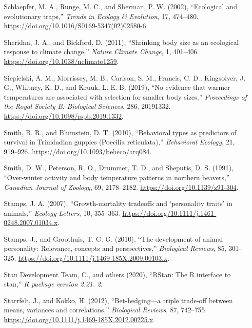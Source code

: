 \documentclass[
  12pt,
  letterpaper,
]{scrartcl}
\newlength{\cslhangindent}
\newenvironment{CSLReferences}[2] %
 {\begin{list}{}{%
  \setlength{\itemindent}{0pt}
  \setlength{\leftmargin}{0pt}
  \setlength{\parsep}{0pt}
  \ifodd #1
   \setlength{\leftmargin}{\cslhangindent}
   \setlength{\itemindent}{-1\cslhangindent}
  \fi
  \setlength{\itemsep}{#2\baselineskip}}}
 {\end{list}}
\begin{document}
\begin{CSLReferences}{1}{0}
Schlaepfer, M. A., Runge, M. C., and Sherman, P. W. (2002),
{``Ecological and evolutionary traps,''} \emph{Trends in Ecology \&
Evolution}, 17, 474--480.
\url{https://doi.org/10.1016/S0169-5347(02)02580-6}.

Sheridan, J. A., and Bickford, D. (2011), {``Shrinking body size as an
ecological response to climate change,''} \emph{Nature Climate Change},
1, 401--406. \url{https://doi.org/10.1038/nclimate1259}.

Siepielski, A. M., Morrissey, M. B., Carlson, S. M., Francis, C. D.,
Kingsolver, J. G., Whitney, K. D., and Kruuk, L. E. B. (2019), {``No
evidence that warmer temperatures are associated with selection for
smaller body sizes,''} \emph{Proceedings of the Royal Society B:
Biological Sciences}, 286, 20191332.
\url{https://doi.org/10.1098/rspb.2019.1332}.

Smith, B. R., and Blumstein, D. T. (2010), {``Behavioral types as
predictors of survival in {Trinidadian} guppies ({Poecilia}
reticulata),''} \emph{Behavioral Ecology}, 21, 919--926.
\url{https://doi.org/10.1093/beheco/arq084}.

Smith, D. W., Peterson, R. O., Drummer, T. D., and Sheputis, D. S.
(1991), {``Over-winter activity and body temperature patterns in
northern beavers,''} \emph{Canadian Journal of Zoology}, 69, 2178--2182.
\url{https://doi.org/10.1139/z91-304}.

Stamps, J. A. (2007), {``Growth-mortality tradeoffs and {`personality
traits'} in animals,''} \emph{Ecology Letters}, 10, 355--363.
\url{https://doi.org/10.1111/j.1461-0248.2007.01034.x}.

Stamps, J., and Groothuis, T. G. G. (2010), {``The development of animal
personality: {Relevance}, concepts and perspectives,''} \emph{Biological
Reviews}, 85, 301--325.
\url{https://doi.org/10.1111/j.1469-185X.2009.00103.x}.

Stan Development Team, C., and others (2020), {``{RStan}: The {R}
interface to stan,''} \emph{R package version 2.21. 2}.

Starrfelt, J., and Kokko, H. (2012), {``Bet-hedging---a triple trade-off
between means, variances and correlations,''} \emph{Biological Reviews},
87, 742--755. \url{https://doi.org/10.1111/j.1469-185X.2012.00225.x}.


\end{CSLReferences}
\end{document}
